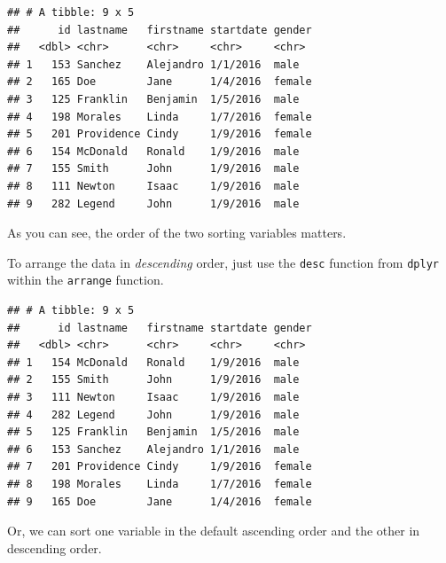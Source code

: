 \documentclass[]{book}
\newenvironment{Shaded}{\begin{snugshade}}{\end{snugshade}}
\newcommand{\KeywordTok}[1]{\textcolor[rgb]{0.13,0.29,0.53}{\textbf{#1}}}
\newcommand{\StringTok}[1]{\textcolor[rgb]{0.31,0.60,0.02}{#1}}
\newcommand{\CommentTok}[1]{\textcolor[rgb]{0.56,0.35,0.01}{\textit{#1}}}
\newcommand{\OperatorTok}[1]{\textcolor[rgb]{0.81,0.36,0.00}{\textbf{#1}}}
\newcommand{\NormalTok}[1]{#1}
\begin{document}
\begin{verbatim}
## # A tibble: 9 x 5
##      id lastname   firstname startdate gender
##   <dbl> <chr>      <chr>     <chr>     <chr> 
## 1   153 Sanchez    Alejandro 1/1/2016  male  
## 2   165 Doe        Jane      1/4/2016  female
## 3   125 Franklin   Benjamin  1/5/2016  male  
## 4   198 Morales    Linda     1/7/2016  female
## 5   201 Providence Cindy     1/9/2016  female
## 6   154 McDonald   Ronald    1/9/2016  male  
## 7   155 Smith      John      1/9/2016  male  
## 8   111 Newton     Isaac     1/9/2016  male  
## 9   282 Legend     John      1/9/2016  male
\end{verbatim}

As you can see, the order of the two sorting variables matters.

To arrange the data in \emph{descending} order, just use the
\texttt{desc} function from \texttt{dplyr} within the \texttt{arrange}
function.

\begin{Shaded}
\end{Shaded}

\begin{verbatim}
## # A tibble: 9 x 5
##      id lastname   firstname startdate gender
##   <dbl> <chr>      <chr>     <chr>     <chr> 
## 1   154 McDonald   Ronald    1/9/2016  male  
## 2   155 Smith      John      1/9/2016  male  
## 3   111 Newton     Isaac     1/9/2016  male  
## 4   282 Legend     John      1/9/2016  male  
## 5   125 Franklin   Benjamin  1/5/2016  male  
## 6   153 Sanchez    Alejandro 1/1/2016  male  
## 7   201 Providence Cindy     1/9/2016  female
## 8   198 Morales    Linda     1/7/2016  female
## 9   165 Doe        Jane      1/4/2016  female
\end{verbatim}

Or, we can sort one variable in the default ascending order and the
other in descending order.

\begin{Shaded}
\end{Shaded}
\end{document}
